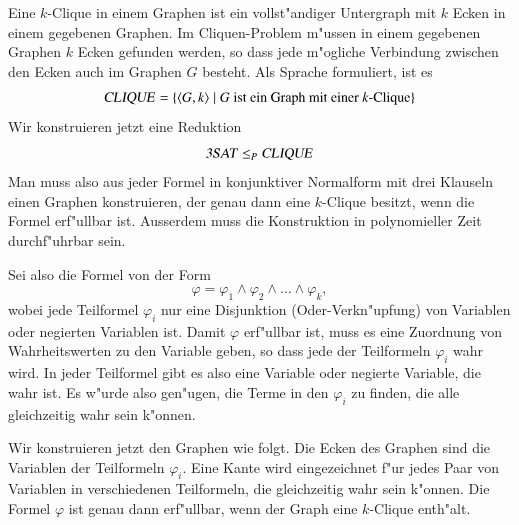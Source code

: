\begin{beispiel}
Eine $k$-Clique in einem Graphen ist ein vollst"andiger
Untergraph mit $k$ Ecken in einem gegebenen Graphen. Im Cliquen-Problem m"ussen
in einem gegebenen Graphen $k$ Ecken gefunden werden, so dass
jede m"ogliche Verbindung zwischen den Ecken auch im Graphen $G$ 
besteht. Als Sprache formuliert, ist es
\[
\text{\textsl{CLIQUE}}
=\{
\langle G,k\rangle\;|\;\text{$G$ ist ein Graph mit einer $k$-Clique}
\}
\]
Wir konstruieren jetzt eine Reduktion 
\[
\text{\textsl{3SAT}}\le_P
\text{\textsl{CLIQUE}}
\]
Man muss also aus jeder Formel in konjunktiver Normalform mit
drei Klauseln einen Graphen konstruieren, der genau dann eine
$k$-Clique besitzt, wenn die Formel erf"ullbar ist. Ausserdem
muss die Konstruktion in polynomieller Zeit durchf"uhrbar sein.

Sei also die Formel von der Form
\[
\varphi
=
\varphi_1\wedge\varphi_2\wedge\dots\wedge\varphi_k,
\]
wobei jede Teilformel $\varphi_i$ nur eine Disjunktion (Oder-Verkn"upfung)
von Variablen oder negierten Variablen ist. Damit $\varphi$
erf"ullbar ist, muss es eine Zuordnung von Wahrheitswerten zu
den Variable geben, so dass jede der Teilformeln $\varphi_i$ wahr
wird. In jeder Teilformel gibt es also eine Variable oder 
negierte Variable, die wahr ist. Es w"urde also gen"ugen,
die Terme in den $\varphi_i$ zu finden, die alle gleichzeitig
wahr sein k"onnen.

Wir konstruieren jetzt den Graphen wie folgt. Die Ecken des Graphen
sind die Variablen der Teilformeln $\varphi_i$. Eine Kante wird
eingezeichnet f"ur jedes Paar von Variablen in verschiedenen
Teilformeln, die gleichzeitig wahr sein k"onnen. Die Formel $\varphi$
ist genau dann erf"ullbar, wenn der Graph eine $k$-Clique enth"alt.


\end{beispiel}

